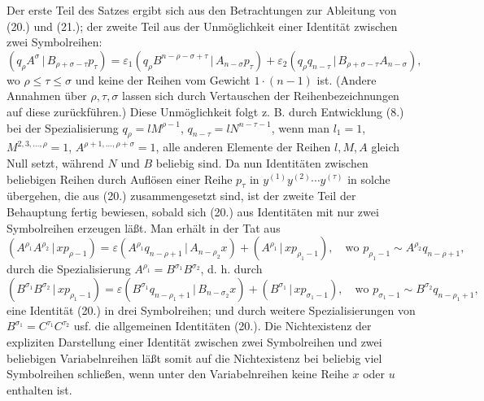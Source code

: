\documentclass[11pt]{article}
\providecommand{\pair}[2]{(#1\,|\,#2)}
\providecommand{\eps}{\varepsilon}
\begin{document}
Der erste Teil des Satzes ergibt sich aus den Betrachtungen zur Ableitung von (20.) und (21.); der zweite Teil aus der Unmöglichkeit einer Identität zwischen zwei Symbolreihen:
\[
\pair{q_\rho A^\sigma}{B_{\rho+\sigma-\tau}p_\tau}
=\eps_1\pair{q_\rho B^{n-\rho-\sigma+\tau}}{A_{n-\sigma}p_\tau}
+\eps_2\pair{q_\rho q_{n-\tau}}{B_{\rho+\sigma-\tau}A_{n-\sigma}},
\]
wo $\rho\le\tau\le\sigma$ und keine der Reihen vom Gewicht $1\cdot(n-1)$ ist. (Andere Annahmen über $\rho,\tau,\sigma$ lassen sich durch Vertauschen der Reihenbezeichnungen auf diese zurückführen.) Diese Unmöglichkeit folgt z. B. durch Entwicklung (8.) bei der Spezialisierung $q_\rho=lM^{\rho-1}$, $q_{n-\tau}=lN^{n-\tau-1}$, wenn man $l_1=1$, $M^{2,3,\ldots,\rho}=1$, $A^{\rho+1,\ldots,\rho+\sigma}=1$, alle anderen Elemente der Reihen $l,M,A$ gleich Null setzt, während $N$ und $B$ beliebig sind. Da nun Identitäten zwischen beliebigen Reihen durch Auflösen einer Reihe $p_\tau$ in $y^{(1)}y^{(2)}\cdots y^{(\tau)}$ in solche übergehen, die aus (20.) zusammengesetzt sind, ist der zweite Teil der Behauptung fertig bewiesen, sobald sich (20.) aus Identitäten mit nur zwei Symbolreihen erzeugen läßt. Man erhält in der Tat aus
\begin{equation}
\pair{A^{\rho_1}A^{\rho_2}}{xp_{\rho-1}}
=\eps\pair{A^{\rho_1}q_{n-\rho+1}}{A_{n-\rho_2}x}
+\pair{A^{\rho_1}}{xp_{\rho_1-1}},
\quad \text{wo }p_{\rho_1-1}\sim A^{\rho_2}q_{n-\rho+1},
\tag{20a}
\end{equation}
durch die Spezialisierung $A^{\rho_1}=B^{\sigma_1}B^{\sigma_2}$, d. h. durch
\[
\pair{B^{\sigma_1}B^{\sigma_2}}{xp_{\rho_1-1}}
=\eps\pair{B^{\sigma_1}q_{n-\rho_1+1}}{B_{n-\sigma_2}x}
+\pair{B^{\sigma_1}}{xp_{\sigma_1-1}},
\quad \text{wo } p_{\sigma_1-1}\sim B^{\sigma_2}q_{n-\rho_1+1},
\]
eine Identität (20.) in drei Symbolreihen; und durch weitere Spezialisierungen von $B^{\sigma_1}=C^{\tau_1}C^{\tau_2}$ usf. die allgemeinen Identitäten (20.). Die Nichtexistenz der expliziten Darstellung einer Identität zwischen zwei Symbolreihen und zwei beliebigen Variabelnreihen läßt somit auf die Nichtexistenz bei beliebig viel Symbolreihen schließen, wenn unter den Variabelnreihen keine Reihe $x$ oder $u$ enthalten ist.

\clearpage
\end{document}
